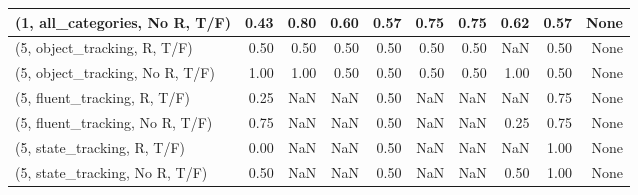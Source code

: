 \begin{table*}[h!]
\begin{adjustbox}{width=2\columnwidth,center}
\begin{tabular}{lrrr|rrr|rrr}
(1, all\_categories, No R, T/F)       &                      0.43 &                  0.80 &                      0.60 &                          0.57 &                      0.75 &                          0.75 &                                   0.62 &                               0.57 &                                  None \\



\midrule
(5, object\_tracking, R, T/F)         &                      0.50 &                  0.50 &                      0.50 &                          0.50 &                      0.50 &                          0.50 &                                    NaN &                               0.50 &                                  None \\
(5, object\_tracking, No R, T/F)      &                      1.00 &                  1.00 &                      0.50 &                          0.50 &                      0.50 &                          0.50 &                                   1.00 &                               0.50 &                                  None \\
(5, fluent\_tracking, R, T/F)         &                      0.25 &                   NaN &                       NaN &                          0.50 &                       NaN &                           NaN &                                    NaN &                               0.75 &                                  None \\
(5, fluent\_tracking, No R, T/F)      &                      0.75 &                   NaN &                       NaN &                          0.50 &                       NaN &                           NaN &                                   0.25 &                               0.75 &                                  None \\
(5, state\_tracking, R, T/F)          &                      0.00 &                   NaN &                       NaN &                          0.50 &                       NaN &                           NaN &                                    NaN &                               1.00 &                                  None \\
(5, state\_tracking, No R, T/F)       &                      0.50 &                   NaN &                       NaN &                          0.50 &                       NaN &                           NaN &                                   0.50 &                               1.00 &                                  None \\

\end{tabular}
\end{adjustbox}
\end{table*}
